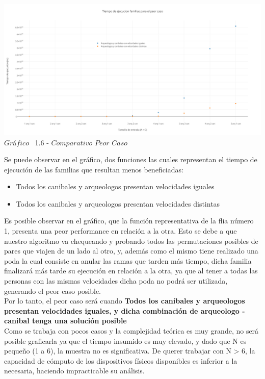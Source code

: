  \vspace*{0.3cm} \vspace*{0.3cm}
  \begin{center}
 \includegraphics[scale=0.45]{./EJ1/comparativopeorcaso.png}
 {$Gr$\'a$fico$ \ 1.6 - $Comparativo$ $Peor$ $Caso$}
  \end{center}
  \vspace*{0.3cm}

Se puede observar en el gr\'afico, dos funciones las cuales representan el tiempo de ejecuci\'on de las familias que resultan menos beneficiadas:\\
\begin{itemize}
\item Todos los canibales y arqueologos presentan velocidades iguales
\item Todos los canibales y arqueologos presentan velocidades distintas
\end{itemize}

Es posible observar en el gr\'afico, que la funci\'on representativa de la flia n\'umero 1, presenta una peor performance en relaci\'on a la otra. Esto se debe a que nuestro algoritmo va chequeando y probando todos las permutaciones posibles de pares que viajen de un lado al otro, y, adem\'as como el mismo tiene realizado una poda la cual consiste en anular las ramas que tarden m\'as tiempo, dicha familia finalizar\'a m\'as tarde su ejecuci\'on en relaci\'on a la otra, ya que al tener a todas las personas con las mismas velocidades dicha poda no podr\'a ser utilizada, generando el peor caso posible.\\

Por lo tanto, el peor caso ser\'a cuando \textbf{Todos los canibales y arqueologos presentan velocidades iguales, y dicha combinaci\'on de arqueologo - canibal tenga una soluci\'on posible}\\

Como se trabaja con pocos casos y la complejidad te\'orica es muy grande, no ser\'a posible graficarla ya que el tiempo insumido es muy elevado, y dado que N es pequeño (1 a 6), la muestra no es significativa. De querer trabajar con N > 6, la capacidad de cómputo de los dispositivos físicos disponibles es inferior a la necesaria, haciendo impracticable su análisis.


